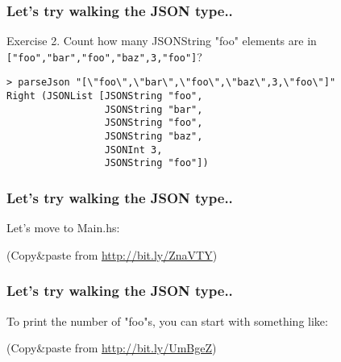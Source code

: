 \documentclass{beamer}
\begin{document}
\begin{frame}[fragile]
\frametitle{Let's try walking the JSON type..}

Exercise 2. Count how many JSONString "foo" elements are in
\verb+["foo","bar","foo","baz",3,"foo"]+?

{\small
\begin{verbatim}
> parseJson "[\"foo\",\"bar\",\"foo\",\"baz\",3,\"foo\"]"
Right (JSONList [JSONString "foo",
                 JSONString "bar",
                 JSONString "foo",
                 JSONString "baz",
                 JSONInt 3,
                 JSONString "foo"])
\end{verbatim}
}

\end{frame}


\begin{frame}[fragile]
\frametitle{Let's try walking the JSON type..}

Let's move to Main.hs:

{\small

}

(Copy\&paste from \href{http://bit.ly/ZnaVTY}{http://bit.ly/ZnaVTY})
\end{frame}


\begin{frame}[fragile]
\frametitle{Let's try walking the JSON type..}

To print the number of "foo"s, you can start with something like:

{\small

}

(Copy\&paste from \href{http://bit.ly/UmBgeZ}{http://bit.ly/UmBgeZ})
\end{frame}
\end{document}
